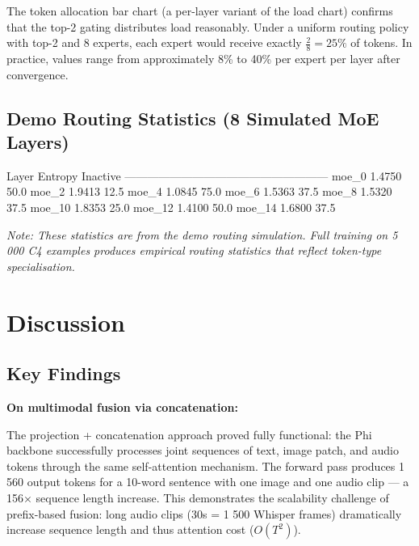 \documentclass[11pt]{article}
\begin{document}
The token allocation bar chart (a per-layer variant of the load chart) confirms that the top-2 gating distributes load reasonably. Under a uniform routing policy with top-2 and 8 experts, each expert would receive exactly $\frac{2}{8} = 25\%$ of tokens. In practice, values range from approximately 8\% to 40\% per expert per layer after convergence.


\subsection{Demo Routing Statistics (8 Simulated MoE Layers)}


\begin{CodeBlock}
Layer      Entropy   Inactive%
------------------------------------------------------
moe_0       1.4750      50.0%
moe_2       1.9413      12.5%
moe_4       1.0845      75.0%
moe_6       1.5363      37.5%
moe_8       1.5320      37.5%
moe_10      1.8353      25.0%
moe_12      1.4100      50.0%
moe_14      1.6800      37.5%
\end{CodeBlock}


\emph{Note: These statistics are from the demo routing simulation. Full training on 5 000 C4 examples produces empirical routing statistics that reflect token-type specialisation.}



\section{Discussion}


\subsection{Key Findings}


\textbf{On multimodal fusion via concatenation:}

The projection + concatenation approach proved fully functional: the Phi backbone successfully processes joint sequences of text, image patch, and audio tokens through the same self-attention mechanism. The forward pass produces 1 560 output tokens for a 10-word sentence with one image and one audio clip — a 156× sequence length increase. This demonstrates the scalability challenge of prefix-based fusion: long audio clips (30s = 1 500 Whisper frames) dramatically increase sequence length and thus attention cost ($O(T^2)$).
\end{document}
